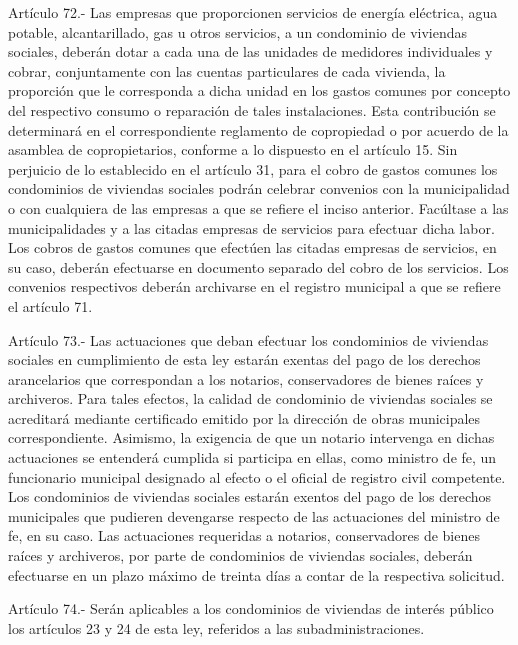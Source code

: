     Artículo 72.- Las empresas que proporcionen servicios de energía eléctrica, agua potable, alcantarillado, gas u otros servicios, a un condominio de viviendas sociales, deberán dotar a cada una de las unidades de medidores individuales y cobrar, conjuntamente con las cuentas particulares de cada vivienda, la proporción que le corresponda a dicha unidad en los gastos comunes por concepto del respectivo consumo o reparación de tales instalaciones. Esta contribución se determinará en el correspondiente reglamento de copropiedad o por acuerdo de la asamblea de copropietarios, conforme a lo dispuesto en el artículo 15.
    Sin perjuicio de lo establecido en el artículo 31, para el cobro de gastos comunes los condominios de viviendas sociales podrán celebrar convenios con la municipalidad o con cualquiera de las empresas a que se refiere el inciso anterior. Facúltase a las municipalidades y a las citadas empresas de servicios para efectuar dicha labor.
    Los cobros de gastos comunes que efectúen las citadas empresas de servicios, en su caso, deberán efectuarse en documento separado del cobro de los servicios. Los convenios respectivos deberán archivarse en el registro municipal a que se refiere el artículo 71.
     
    Artículo 73.- Las actuaciones que deban efectuar los condominios de viviendas sociales en cumplimiento de esta ley estarán exentas del pago de los derechos arancelarios que correspondan a los notarios, conservadores de bienes raíces y archiveros. Para tales efectos, la calidad de condominio de viviendas sociales se acreditará mediante certificado emitido por la dirección de obras municipales correspondiente. Asimismo, la exigencia de que un notario intervenga en dichas actuaciones se entenderá cumplida si participa en ellas, como ministro de fe, un funcionario municipal designado al efecto o el oficial de registro civil competente.
    Los condominios de viviendas sociales estarán exentos del pago de los derechos municipales que pudieren devengarse respecto de las actuaciones del ministro de fe, en su caso.
    Las actuaciones requeridas a notarios, conservadores de bienes raíces y archiveros, por parte de condominios de viviendas sociales, deberán efectuarse en un plazo máximo de treinta días a contar de la respectiva solicitud.
     
    Artículo 74.- Serán aplicables a los condominios de viviendas de interés público los artículos 23 y 24 de esta ley, referidos a las subadministraciones.
     
